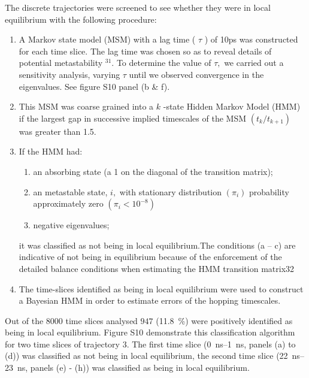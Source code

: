 The discrete trajectories were screened to see whether they were in local equilibrium with the following procedure:
\begin{enumerate}
    \item A Markov state model (MSM) with a lag time ( $\tau$ ) of 10ps was constructed for each time slice. The lag time was chosen so as to reveal details of potential metastability $^{31} .$ To determine the value of $\tau,$ we carried out a sensitivity analysis, varying $\tau$ until we observed convergence in the eigenvalues. See figure S10 panel (b \& f).
    \item This MSM was coarse grained into a $k$ -state Hidden Markov Model (HMM) if the largest gap in successive implied timescales of the MSM $\left(t_{k} / t_{k+1}\right)$ was greater than 1.5. 
    \item If the HMM had:
    \begin{enumerate}
        \item an absorbing state (a 1 on the diagonal of the transition matrix);
        \item an metastable state, $i,$ with stationary distribution $\left(\pi_{i}\right)$ probability approximately zero $\left(\pi_{i}< 10^{-8}\right)$
        \item negative eigenvalues; 
    \end{enumerate}
    it was classified as not being in local equilibrium.The conditions (a – c) are indicative of not being in equilibrium because of the enforcement of the detailed balance conditions when estimating the HMM transition matrix32
    \item The time-slices identified as being in local equilibrium were used to construct a Bayesian HMM in order to estimate errors of the hopping timescales. 
\end{enumerate}

Out of the $8000$ time slices analysed $947$ (\SI{11.8}{\percent}) were positively identified as being in local equilibrium. Figure S10 demonstrate this classification algorithm for two time slices of trajectory 3. The first time slice (\SIrange{0}{1}{\nano\second}, panels (a) to (d)) was classified as not being in local equilibrium, the second time slice (\SIrange{22}{23}{\nano\second}, panels (e) - (h)) was classified as being in local equilibrium.


